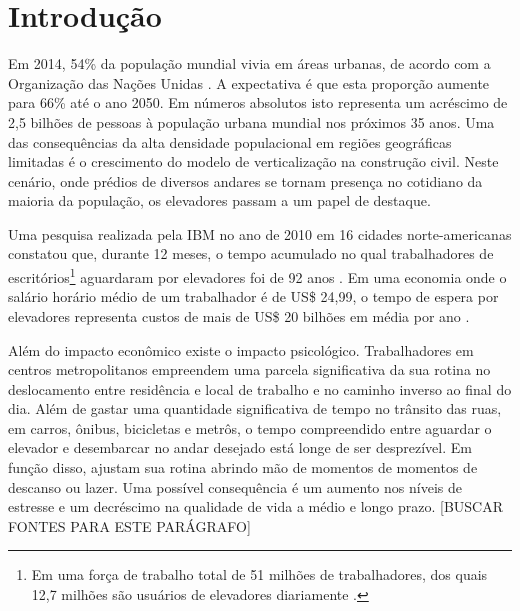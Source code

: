 \chapter{\label{chap:intro}Introdução}

Em 2014, 54\% da população mundial vivia em áreas urbanas, de acordo com a Organização das Nações Unidas \cite{UN14}. A expectativa é que esta proporção aumente para 66\% até o ano 2050. Em números absolutos isto representa um acréscimo de 2,5 bilhões de pessoas à população urbana mundial nos próximos 35 anos. Uma das consequências da alta densidade populacional em regiões geográficas limitadas é o crescimento do modelo de verticalização na construção civil. Neste cenário, onde prédios de diversos andares se tornam presença no cotidiano da maioria da população, os elevadores passam a um papel de destaque.

Uma pesquisa realizada pela IBM no ano de 2010 em 16 cidades norte-americanas constatou que, durante 12 meses, o tempo acumulado no qual trabalhadores de escritórios\footnote{Em uma força de trabalho total de 51 milhões de trabalhadores, dos quais 12,7 milhões são usuários de elevadores diariamente \cite{IBM10}.} aguardaram por elevadores foi de 92 anos \cite{IBM10}. Em uma economia onde o salário horário médio de um trabalhador é de US\$ 24,99, o tempo de espera por elevadores representa custos de mais de US\$ 20 bilhões em média por ano \cite{BLS15}.

Além do impacto econômico existe o impacto psicológico. Trabalhadores em centros metropolitanos empreendem uma parcela significativa da sua rotina no deslocamento entre residência e local de trabalho e no caminho inverso ao final do dia. Além de gastar uma quantidade significativa de tempo no trânsito das ruas, em carros, ônibus, bicicletas e metrôs, o tempo compreendido entre aguardar o elevador e desembarcar no andar desejado está longe de ser desprezível. Em função disso, ajustam sua rotina abrindo mão de momentos de momentos de descanso ou lazer. Uma possível consequência é um aumento nos níveis de estresse e um decréscimo na qualidade de vida a médio e longo prazo. {\color{red}[BUSCAR FONTES PARA ESTE PARÁGRAFO]} %

